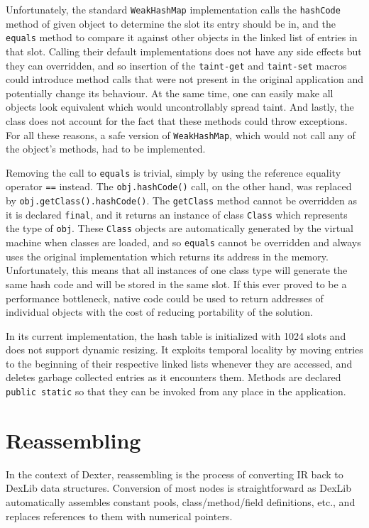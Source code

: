 \documentclass[12pt,twoside,notitlepage]{report}
\begin{document}
Unfortunately, the standard \verb$WeakHashMap$ implementation calls the \verb$hashCode$ method of given object to determine the slot its entry should be in, and the \verb$equals$ method to compare it against other objects in the linked list of entries in that slot. Calling their default implementations does not have any side effects but they can overridden, and so insertion of the \verb$taint-get$ and \verb$taint-set$ macros could introduce method calls that were not present in the original application and potentially change its behaviour. At the same time, one can easily make all objects look equivalent which would uncontrollably spread taint. And lastly, the class does not account for the fact that these methods could throw exceptions. For all these reasons, a safe version of \verb$WeakHashMap$, which would not call any of the object's methods, had to be implemented. 

Removing the call to \verb$equals$ is trivial, simply by using the reference equality operator \verb$==$ instead. The \verb$obj.hashCode()$ call, on the other hand, was replaced by \verb$obj.getClass().hashCode()$. The \verb$getClass$ method cannot be overridden as it is declared \verb$final$, and it returns an instance of class \verb$Class$ which represents the type of \verb$obj$. These \verb$Class$ objects are automatically generated by the virtual machine when classes are loaded, and so \verb$equals$ cannot be overridden and always uses the original implementation which returns its address in the memory. Unfortunately, this means that all instances of one class type will generate the same hash code and will be stored in the same slot. If this ever proved to be a performance bottleneck, native code could be used to return addresses of individual objects with the cost of reducing portability of the solution. 

In its current implementation, the hash table is initialized with 1024 slots and does not support dynamic resizing. It exploits temporal locality by moving entries to the beginning of their respective linked lists whenever they are accessed, and deletes garbage collected entries as it encounters them. Methods are declared \verb$public static$ so that they can be invoked from any place in the application.

\section{Reassembling}

In the context of Dexter, reassembling is the process of converting IR back to DexLib data structures. Conversion of most nodes is straightforward as DexLib automatically assembles constant pools, class/method/field definitions, etc., and replaces references to them with numerical pointers. 
\end{document}
